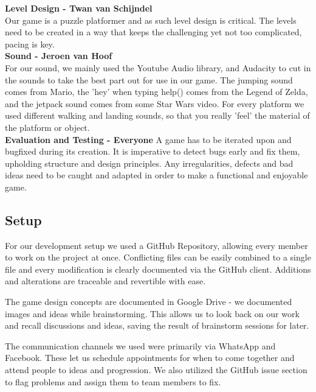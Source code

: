 \documentclass[a4paper,twoside,12pt]{article}
\begin{document}
\textbf{Level Design - Twan van Schijndel} \\
Our game is a puzzle platformer and as such level design is critical. The levels need to be created in a way that keeps the challenging yet not too complicated, pacing is key. \\

\textbf{Sound - Jeroen van Hoof}\\
For our sound, we mainly used the Youtube Audio library, and Audacity to cut in the sounds to take the best part out for use in our game. The jumping sound comes from Mario, the 'hey' when typing help() comes from the Legend of Zelda, and the jetpack sound comes from some Star Wars video. For every platform we used different walking and landing sounds, so that you really 'feel' the material of the platform or object.\\

\textbf{Evaluation and Testing - Everyone}
A game has to be iterated upon and bugfixed during its creation. It is imperative to detect bugs early and fix them, upholding structure and design principles. Any irregularities, defects and bad ideas need to be caught and adapted in order to make a functional and enjoyable game.\\

\subsection{Setup}

For our development setup we used a GitHub Repository, allowing every member to work on the project at once. Conflicting files can be easily combined to a single file and every modification is clearly documented via the GitHub client. Additions and alterations are traceable and revertible with ease.

The game design concepts are documented in Google Drive - we documented images and ideas while brainstorming. This allows us to look back on our work and recall discussions and ideas, saving the result of brainstorm sessions for later.


The communication channels we used were primarily via WhatsApp and Facebook. These let us schedule appointments for when to come together and attend people to ideas and progression. We also utilized the GitHub issue section to flag problems and assign them to team members to fix.
\end{document}
